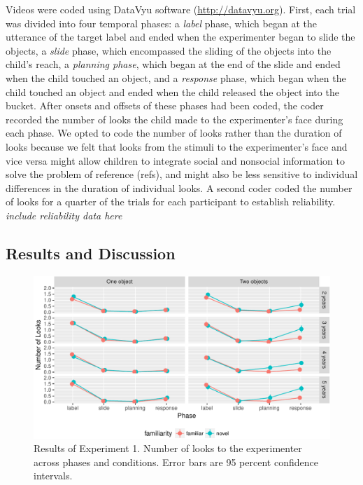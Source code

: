 \documentclass[10pt, letterpaper]{article}
\newenvironment{CodeChunk}{}{}
\begin{document}
Videos were coded using DataVyu software (\url{http://datavyu.org}).
First, each trial was divided into four temporal phases: a \emph{label}
phase, which began at the utterance of the target label and ended when
the experimenter began to slide the objects, a \emph{slide} phase, which
encompassed the sliding of the objects into the child's reach, a
\emph{planning phase}, which began at the end of the slide and ended
when the child touched an object, and a \emph{response} phase, which
began when the child touched an object and ended when the child released
the object into the bucket. After onsets and offsets of these phases had
been coded, the coder recorded the number of looks the child made to the
experimenter's face during each phase. We opted to code the number of
looks rather than the duration of looks because we felt that looks from
the stimuli to the experimenter's face and vice versa might allow
children to integrate social and nonsocial information to solve the
problem of reference (refs), and might also be less sensitive to
individual differences in the duration of individual looks. A second
coder coded the number of looks for a quarter of the trials for each
participant to establish reliability. \emph{include reliability data
here}

\subsection{Results and Discussion}\label{results-and-discussion}

\begin{CodeChunk}
\begin{figure}[h]

{\centering \includegraphics{figs/results_e1-1} 

}

\caption[Results of Experiment 1]{Results of Experiment 1. Number of looks to the experimenter across phases and conditions. Error bars are 95 percent confidence intervals.}\label{fig:results_e1}
\end{figure}
\end{CodeChunk}
\end{document}
